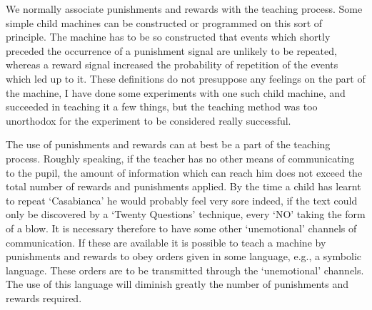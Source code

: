 \documentclass[10pt]{article} %
\begin{document}
We normally associate punishments and rewards with the teaching process. Some simple child machines can be constructed or programmed on this sort of principle. The machine has to be so constructed that events which shortly preceded the occurrence of a punishment signal are unlikely to be repeated, whereas a reward signal increased the probability of repetition of the events which led up to it. These definitions do not presuppose any feelings on the part of the machine, I have done some experiments with one such child machine, and succeeded in teaching it a few things, but the teaching method was too unorthodox for the experiment to be considered really successful.

The use of punishments and rewards can at best be a part of the teaching process. Roughly speaking, if the teacher has no other means of communicating to the pupil, the amount of information which can reach him does not exceed the total number of rewards and punishments applied. By the time a child has learnt to repeat `Casabianca' he would probably feel very sore indeed, if the text could only be discovered by a `Twenty Questions' technique, every `NO' taking the form of a blow. It is necessary therefore to have some other `unemotional' channels of communication. If these are available it is possible to teach a machine by punishments and rewards to obey orders given in some language, e.g., a symbolic language. These orders are to be transmitted through the `unemotional' channels. The use of this language will diminish greatly the number of punishments and rewards required.
\end{document}
